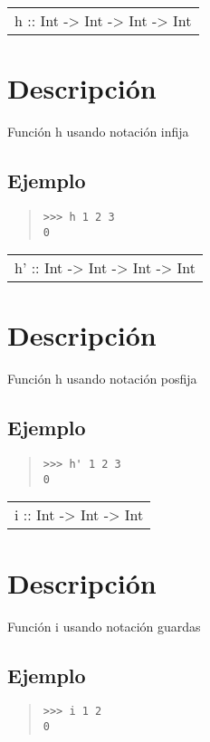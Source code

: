 \begin{haddockdesc}
\item[\begin{tabular}{@{}l}
h :: Int -> Int -> Int -> Int
\end{tabular}]
{\haddockbegindoc
\section*{Descripción}
Función h usando notación infija\par
\subsection*{Ejemplo}
\begin{quote}
{\haddockverb\begin{verbatim}
>>> h 1 2 3
0

\end{verbatim}}
\end{quote}}
\end{haddockdesc}
\begin{haddockdesc}
\item[\begin{tabular}{@{}l}
h' :: Int -> Int -> Int -> Int
\end{tabular}]
{\haddockbegindoc
\section*{Descripción}
Función h usando notación posfija\par
\subsection*{Ejemplo}
\begin{quote}
{\haddockverb\begin{verbatim}
>>> h' 1 2 3
0

\end{verbatim}}
\end{quote}}
\end{haddockdesc}
\begin{haddockdesc}
\item[\begin{tabular}{@{}l}
i :: Int -> Int -> Int
\end{tabular}]
{\haddockbegindoc
\section*{Descripción}
Función i usando notación guardas\par
\subsection*{Ejemplo}
\begin{quote}
{\haddockverb\begin{verbatim}
>>> i 1 2
0

\end{verbatim}}
\end{quote}}
\end{haddockdesc}
